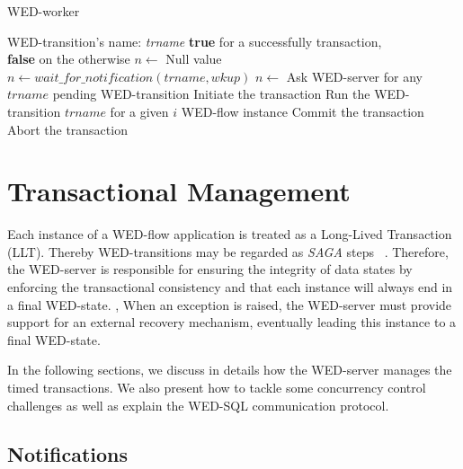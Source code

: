 \documentclass[12pt]{article}
\begin{document}
\begin{algorithm}
\caption{WED-worker}
\label{alg2}
\begin{algorithmic}[1]
\REQUIRE WED-transition's name: \emph{trname}
\ENSURE \textbf{true} for a successfully transaction,\\
         \hspace{23pt}\textbf{false} on the otherwise
\LOOP
\STATE $n \leftarrow$ Null value
\STATE $n \leftarrow wait\_for\_notification(trname,wkup)$
\STATE $n \leftarrow $ Ask WED-server for any $trname$ pending WED-transition
\ENDIF
\ENDWHILE
\STATE Initiate the transaction
\STATE Run the WED-transition $trname$ for a given $i$ WED-flow instance
\STATE Commit the transaction
\RETURN \TRUE
\ELSE
\STATE Abort the transaction
\RETURN \FALSE
\ENDIF  
\ENDLOOP

\end{algorithmic}
\end{algorithm}

\section{Transactional Management}
\label{sec:prot}

Each instance of a WED-flow application is  treated as a Long-Lived Transaction (LLT). Thereby WED-transitions may be regarded as \emph{SAGA} steps ~\cite{SGD87}. Therefore, the WED-server is responsible for ensuring the integrity of data states by enforcing the transactional consistency and that each instance will always end in a final WED-state. , When an exception is raised, the WED-server  must provide support for an external recovery mechanism, eventually leading this instance to a final WED-state. 

In the following sections, we discuss in details how the WED-server manages the timed transactions. We also present how to tackle some concurrency control challenges as well as explain the WED-SQL communication protocol. 

\subsection{Notifications}
\label{not}
\end{document}
